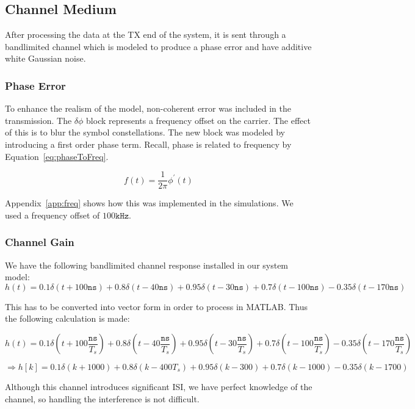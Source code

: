 \documentclass[]{article}
\begin{document}
\subsection{Channel Medium}
\label{sec:channel}
After processing the data at the TX end of the system, it is sent through a bandlimited channel which is modeled to produce a phase error and have additive white Gaussian noise. 

\subsubsection{Phase Error}
\label{sec:phaseError}
To enhance the realism of the model, non-coherent error was included in the transmission. The $\delta\phi$ block represents a frequency offset on the carrier.  The effect of this is to blur the symbol constellations.  The new block was modeled by introducing a first order phase term.  Recall, phase is related to frequency by Equation~\ref{eq:phaseToFreq}.

\begin{equation}
\label{eq:phaseToFreq}
f(t) = \frac{1}{2 \pi} \phi^\prime(t)
\end{equation}

Appendix~\ref{app:freq} shows how this was implemented in the simulations.  We used a frequency offset of $100 \mathtt{kHz}$.  

\subsubsection{Channel Gain}
\label{sec:channelFilter}
We have the following bandlimited channel response installed in our system model:
 $$h(t) = 0.1\delta(t + 100 \mathtt{ns}) + 0.8\delta(t -40 \mathtt{ns}) + 0.95\delta(t - 30 \mathtt{ns}) + 0.7\delta(t - 100 \mathtt{ns}) - 0.35\delta(t - 170 \mathtt{ns})  $$
 
This has to be converted into vector form in order to process in MATLAB. Thus the following calculation is made: 
 
 $$h(t) = 0.1\delta(t + 100 \frac{\mathtt{ns}}{T_s}) + 0.8\delta(t -40 \frac{\mathtt{ns}}{T_s}) + 0.95\delta(t - 30 \frac{\mathtt{ns}}{T_s}) + 0.7\delta(t - 100 \frac{\mathtt{ns}}{T_s}) - 0.35\delta(t - 170 \frac{\mathtt{ns}}{T_s})  $$
 
 $$ \Rightarrow h[k] = 0.1\delta(k + 1000) + 0.8\delta(k -400 T_s) + 0.95\delta(k - 300) + 0.7\delta(k - 1000) - 0.35\delta(k - 1700)$$
 
Although this channel introduces significant ISI, we have perfect knowledge of the channel, so handling the interference is not difficult. \\
\end{document}
